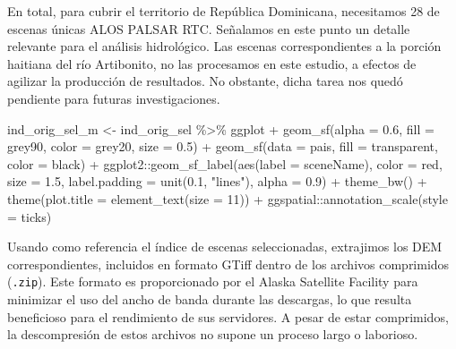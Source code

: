 \documentclass[spanish]{article}
\newenvironment{Shaded}{\begin{snugshade}}{\end{snugshade}}
\newcommand{\AttributeTok}[1]{\textcolor[rgb]{0.77,0.63,0.00}{#1}}
\newcommand{\DecValTok}[1]{\textcolor[rgb]{0.00,0.00,0.81}{#1}}
\newcommand{\FloatTok}[1]{\textcolor[rgb]{0.00,0.00,0.81}{#1}}
\newcommand{\FunctionTok}[1]{\textcolor[rgb]{0.00,0.00,0.00}{#1}}
\newcommand{\NormalTok}[1]{#1}
\newcommand{\OtherTok}[1]{\textcolor[rgb]{0.56,0.35,0.01}{#1}}
\newcommand{\SpecialCharTok}[1]{\textcolor[rgb]{0.00,0.00,0.00}{#1}}
\newcommand{\StringTok}[1]{\textcolor[rgb]{0.31,0.60,0.02}{#1}}
\begin{document}
En total, para cubrir el territorio de República Dominicana, necesitamos
28 de escenas únicas ALOS PALSAR RTC. Señalamos en este punto un detalle
relevante para el análisis hidrológico. Las escenas correspondientes a
la porción haitiana del río Artibonito, no las procesamos en este
estudio, a efectos de agilizar la producción de resultados. No obstante,
dicha tarea nos quedó pendiente para futuras investigaciones.

\begin{Shaded}
\begin{Highlighting}[]
\NormalTok{ind\_orig\_sel\_m }\OtherTok{\textless{}{-}}\NormalTok{ ind\_orig\_sel }\SpecialCharTok{\%\textgreater{}\%}
\NormalTok{  ggplot }\SpecialCharTok{+}
  \FunctionTok{geom\_sf}\NormalTok{(}\AttributeTok{alpha =} \FloatTok{0.6}\NormalTok{, }\AttributeTok{fill =} \StringTok{\textquotesingle{}grey90\textquotesingle{}}\NormalTok{, }\AttributeTok{color =} \StringTok{\textquotesingle{}grey20\textquotesingle{}}\NormalTok{, }\AttributeTok{size =} \FloatTok{0.5}\NormalTok{) }\SpecialCharTok{+}
  \FunctionTok{geom\_sf}\NormalTok{(}\AttributeTok{data =}\NormalTok{ pais, }\AttributeTok{fill =} \StringTok{\textquotesingle{}transparent\textquotesingle{}}\NormalTok{, }\AttributeTok{color =} \StringTok{\textquotesingle{}black\textquotesingle{}}\NormalTok{) }\SpecialCharTok{+}
\NormalTok{  ggplot2}\SpecialCharTok{::}\FunctionTok{geom\_sf\_label}\NormalTok{(}\FunctionTok{aes}\NormalTok{(}\AttributeTok{label =}\NormalTok{ sceneName), }\AttributeTok{color =} \StringTok{\textquotesingle{}red\textquotesingle{}}\NormalTok{, }\AttributeTok{size =} \FloatTok{1.5}\NormalTok{,}
                \AttributeTok{label.padding =} \FunctionTok{unit}\NormalTok{(}\FloatTok{0.1}\NormalTok{, }\StringTok{"lines"}\NormalTok{), }\AttributeTok{alpha =} \FloatTok{0.9}\NormalTok{) }\SpecialCharTok{+}
  \FunctionTok{theme\_bw}\NormalTok{() }\SpecialCharTok{+} 
  \FunctionTok{theme}\NormalTok{(}\AttributeTok{plot.title =} \FunctionTok{element\_text}\NormalTok{(}\AttributeTok{size =} \DecValTok{11}\NormalTok{)) }\SpecialCharTok{+}
\NormalTok{  ggspatial}\SpecialCharTok{::}\FunctionTok{annotation\_scale}\NormalTok{(}\AttributeTok{style =} \StringTok{\textquotesingle{}ticks\textquotesingle{}}\NormalTok{)}
\end{Highlighting}
\end{Shaded}

Usando como referencia el índice de escenas seleccionadas, extrajimos
los DEM correspondientes, incluidos en formato GTiff dentro de los
archivos comprimidos (\texttt{.zip}). Este formato es proporcionado por
el Alaska Satellite Facility para minimizar el uso del ancho de banda
durante las descargas, lo que resulta beneficioso para el rendimiento de
sus servidores. A pesar de estar comprimidos, la descompresión de estos
archivos no supone un proceso largo o laborioso.
\end{document}
